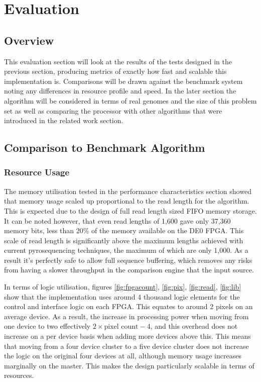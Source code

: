 \chapter{Evaluation}
\renewcommand{\baselinestretch}{\mystretch}
\label{chap:evaluation}
\section{Overview}
This evaluation section will look at the results of the tests designed in the previous section, producing metrics of exactly how fast and scalable this implementation is. Comparisons will be drawn against the benchmark system noting any differences in resource profile and speed. In the later section the algorithm will be considered in terms of real genomes and the size of this problem set as well as comparing the processor with other algorithms that were introduced in the related work section.
\section{Comparison to Benchmark Algorithm}
\subsection{Resource Usage}
The memory utilisation tested in the performance characteristics section showed that memory usage scaled up proportional to the read length for the algorithm. This is expected due to the design of full read length sized FIFO memory storage. It can be noted however, that even read lengths of 1,600 gave only 37,360 memory bits, less than 20\% of the memory available on the DE0 FPGA. This scale of read length is significantly above the maximum lengths achieved with current pyrosequencing techniques, the maximum of which are only 1,000. As a result it's perfectly safe to allow full sequence buffering, which removes any risks from having a slower throughput in the comparison engine that the input source. 

In terms of logic utilisation, figures \ref{fig:fpgacount}, \ref{fig:pix}, \ref{fig:read}, \ref{fig:lib} show that the implementation uses around 4 thousand logic elements for the control and interface logic on each FPGA. This equates to around 2 pixels on an average device. As a result, the increase in processing power when moving from one device to two effectively $2\times \text{pixel count} - 4 $, and this overhead does not increase on a per device basis when adding more devices above this. This means that moving from a four device cluster to a five device cluster does not increase the logic on the original four devices at all, although memory usage increases marginally on the master. This makes the design particularly scalable in terms of resources.

